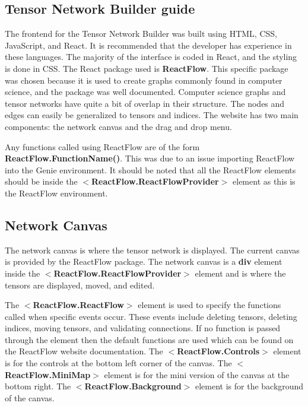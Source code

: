 \documentclass{juliacon}
\begin{document}


\begin{appendix}


\section{Tensor Network Builder guide}\label{builder}

The frontend for the Tensor Network Builder was built using HTML, CSS, JavaScript, and React. It is recommended that the developer has experience in these languages. The majority of the interface is coded in React, and the styling is done in CSS. The React package used is \textbf{ReactFlow}. This specific package was chosen because it is used to create graphs commonly found in computer science, and the package was well documented. Computer science graphs and tensor networks have quite a bit of overlap in their structure. The nodes and edges can easily be generalized to tensors and indices. The website has two main components: the network canvas and the drag and drop menu.

Any functions called using ReactFlow are of the form \textbf{ReactFlow.FunctionName()}. This was due to an issue importing ReactFlow into the Genie environment. It should be noted that all the ReactFlow elements should be inside the $<$\textbf{ReactFlow.ReactFlowProvider}$>$ element as this is the ReactFlow environment. 

\subsection{Network Canvas}

The network canvas is where the tensor network is displayed. The current canvas is provided by the ReactFlow package. The network canvas is a \textbf{div} element inside the $<$\textbf{ReactFlow.ReactFlowProvider}$>$ element and is where the tensors are displayed, moved, and edited.

The $<$\textbf{ReactFlow.ReactFlow}$>$ element is used to specify the functions called when specific events occur. These events include deleting tensors, deleting indices, moving tensors, and validating connections. If no function is passed through the element then the default functions are used which can be found on the ReactFlow website documentation. The $<$\textbf{ReactFlow.Controls}$>$ element is for the controls at the bottom left corner of the canvas. The $<$\textbf{ReactFlow.MiniMap}$>$ element is for the mini version of the canvas at the bottom right. The $<$\textbf{ReactFlow.Background}$>$ element is for the background of the canvas.



\end{appendix}
\end{document}
